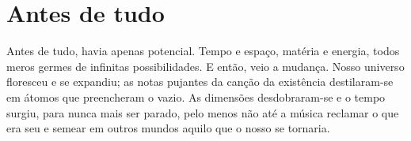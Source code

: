 \chapter{Antes de tudo}

Antes de tudo, havia apenas potencial. Tempo e espaço, matéria e
energia, todos meros germes de infinitas possibilidades. E então, veio a
mudança. Nosso universo floresceu e se expandiu; as notas pujantes da
canção da existência destilaram-se em átomos que preencheram o vazio. As
dimensões desdobraram-se e o tempo surgiu, para nunca mais ser parado,
pelo menos não até a música reclamar o que era seu e semear em outros
mundos aquilo que o nosso se tornaria.
